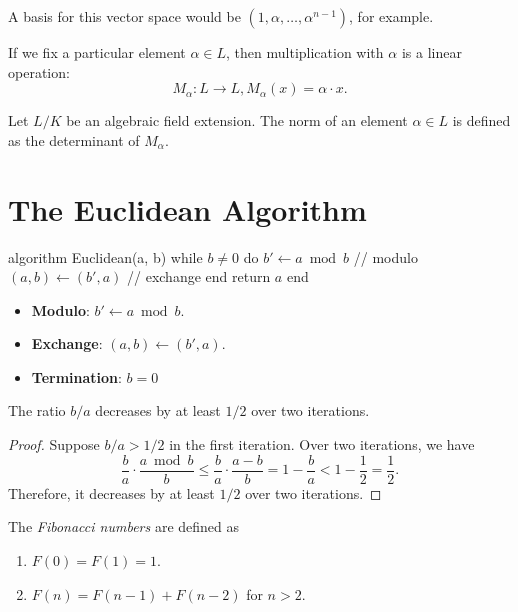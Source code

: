A basis for this vector space would be $(1, α, …, α^{n-1})$, for example.

If we fix a particular element $α ∈ L$, then multiplication with $α$ is a linear operation:
\[
  M_α : L → L, M_α(x) = α · x.
\]

\begin{definition}
  Let $L/K$ be an algebraic field extension.
  The norm of an element $α ∈ L$ is defined as the determinant of $M_α$.
\end{definition}

\section{The Euclidean Algorithm}

\begin{Pseudocode}
algorithm Euclidean(a, b)
  while $b ≠ 0$ do
    $b' ← a \bmod b$ // modulo
    $(a, b) ← (b', a)$ // exchange
  end
  return $a$
end
\end{Pseudocode}

\begin{itemize}
  \item \textbf{Modulo}: $b' ← a \bmod b$.
  \item \textbf{Exchange}: $(a, b) ← (b', a)$.
  \item \textbf{Termination}: $b = 0$
\end{itemize}

\begin{proposition}
  The ratio $b/a$ decreases by at least $1/2$ over two iterations.
\end{proposition}

\begin{proof}
  Suppose $b/a > 1/2$ in the first iteration.
  Over two iterations, we have
  \[
    \frac{b}{a} · \frac{a \bmod b}{b}
    ≤ \frac{b}{a} · \frac{a - b}{b}
    = 1 - \frac{b}{a}
    < 1 - \frac{1}{2}
    = \frac{1}{2}.
  \]
  Therefore, it decreases by at least $1/2$ over two iterations.
\end{proof}

\begin{definition}
  The \emph{Fibonacci numbers} are defined as
  \begin{enumerate}
    \item $F(0) = F(1) = 1$.
    \item $F(n) = F(n - 1) + F(n - 2)$ for $n > 2$.
  \end{enumerate}
\end{definition}

